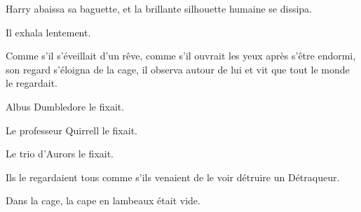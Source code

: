 Harry abaissa sa baguette, et la brillante silhouette humaine se dissipa.

Il exhala lentement.

Comme s'il s'éveillait d'un rêve, comme s'il ouvrait les yeux après s'être endormi, son regard s'éloigna de la cage, il observa autour de lui et vit que tout le monde le regardait.

Albus Dumbledore le fixait.

Le professeur Quirrell le fixait.

Le trio d'Aurors le fixait.

Ils le regardaient tous comme s'ils venaient de le voir détruire un Détraqueur.

Dans la cage, la cape en lambeaux était vide. 

